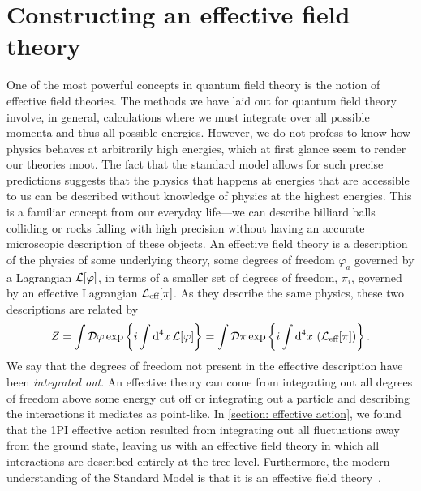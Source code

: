\section{Constructing an effective field theory}
\label{section: effective field theories}

One of the most powerful concepts in quantum field theory is the notion of effective field theories.
The methods we have laid out for quantum field theory involve, in general, calculations where we must integrate over all possible momenta and thus all possible energies.
However, we do not profess to know how physics behaves at arbitrarily high energies, which at first glance seem to render our theories moot.
The fact that the standard model allows for such precise predictions suggests that the physics that happens at energies that are accessible to us can be described without knowledge of physics at the highest energies.
This is a familiar concept from our everyday life---we can describe billiard balls colliding or rocks falling with high precision without having an accurate microscopic description of these objects.
An effective field theory is a description of the physics of some underlying theory, some degrees of freedom $\varphi_a$ governed by a Lagrangian $\mathcal{L}[\varphi]$, in terms of a smaller set of degrees of freedom, $\pi_i$, governed by an effective Lagrangian $\mathcal{L}_\text{eff}[\pi]$.
As they describe the same physics, these two descriptions are related by 
%
\begin{equation}
    Z = \int \mathcal D \varphi \, \text{exp} \left\{ i\int \text{d}^4 x \, \mathcal{L}[\varphi] \right\}
    = \int \mathcal D \pi\, \text{exp} \left\{ i\int \text{d}^4 x \, \left( \mathcal{L}_\text{eff}[\pi]\right) \right\}.
\end{equation}
%
We say that the degrees of freedom not present in the effective description have been \emph{integrated out}.
An effective theory can come from integrating out all degrees of freedom above some energy cut off or integrating out a particle and describing the interactions it mediates as point-like.
In \autoref{section: effective action}, we found that the 1PI effective action resulted from integrating out all fluctuations away from the ground state, leaving us with an effective field theory in which all interactions are described entirely at the tree level.
Furthermore, the modern understanding of the Standard Model is that it is an effective field theory~\autocite{pencoIntroductionEffectiveField2020}.

